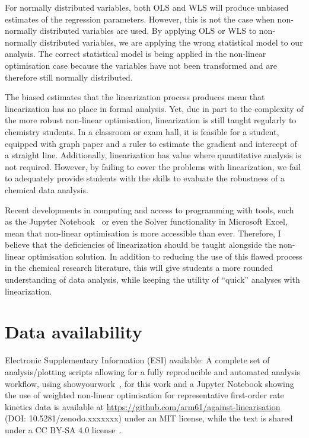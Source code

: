 \documentclass[journal=jceda8,manuscript=article]{achemso}
\begin{document}
For normally distributed variables, both OLS and WLS will produce unbiased estimates of the regression parameters. 
However, this is not the case when non-normally distributed variables are used. 
By applying OLS or WLS to non-normally distributed variables, we are applying the wrong statistical model to our analysis. 
The correct statistical model is being applied in the non-linear optimisation case because the variables have not been transformed and are therefore still normally distributed. 

The biased estimates that the linearization process produces mean that linearization has no place in formal analysis. 
Yet, due in part to the complexity of the more robust non-linear optimisation, linearization is still taught regularly to chemistry students. 
In a classroom or exam hall, it is feasible for a student, equipped with graph paper and a ruler to estimate the gradient and intercept of a straight line. 
Additionally, linearization has value where quantitative analysis is not required. 
However, by failing to cover the problems with linearization, we fail to adequately provide students with the skills to evaluate the robustness of a chemical data analysis. 

Recent developments in computing and access to programming with tools, such as the Jupyter Notebook~\cite{kluyver_jupyter_2016} or even the Solver functionality in Microsoft Excel, mean that non-linear optimisation is more accessible than ever. 
Therefore, I believe that the deficiencies of linearization should be taught alongside the non-linear optimisation solution. 
In addition to reducing the use of this flawed process in the chemical research literature, this will give students a more rounded understanding of data analysis, while keeping the utility of ``quick'' analyses with linearization.

\section*{Data availability}

Electronic Supplementary Information (ESI) available: A complete set of analysis/plotting scripts allowing for a fully reproducible and automated analysis workflow, using showyourwork~\cite{luger_showyourwork_2021}, for this work and a Jupyter Notebook showing the use of weighted non-linear optimisation for representative first-order rate kinetics data is available at \url{https://github.com/arm61/against-linearisation} (DOI: 10.5281/zenodo.xxxxxxx) under an MIT license, while the text is shared under a CC BY-SA 4.0 license~\cite{mccluskey_github_2023}.
\end{document}
